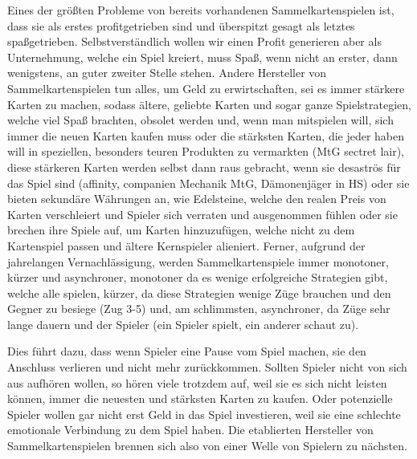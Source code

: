 \documentclass[fontsize=12]{scrartcl}
\begin{document}
	Eines der größten Probleme von bereits vorhandenen Sammelkartenspielen ist, dass sie als erstes profitgetrieben sind und überspitzt gesagt als letztes spaßgetrieben. Selbstverständlich wollen wir einen Profit generieren aber als Unternehmung, welche ein Spiel kreiert, muss Spaß, wenn nicht an erster, dann wenigstens, an guter zweiter Stelle stehen. Andere Hersteller von Sammelkartenspielen tun alles, um Geld zu erwirtschaften, sei es immer stärkere Karten zu machen, sodass ältere, geliebte Karten und sogar ganze Spielstrategien, welche viel Spaß brachten, obsolet werden und, wenn man mitspielen will, sich immer die neuen Karten kaufen muss oder die stärksten Karten, die jeder haben will in speziellen, besonders teuren Produkten zu vermarkten (MtG sectret lair), diese stärkeren Karten werden selbst dann raus gebracht, wenn sie desaströs für das Spiel sind (affinity, companien Mechanik MtG, Dämonenjäger in HS) oder sie bieten sekundäre Währungen an, wie Edelsteine, welche den realen Preis von Karten verschleiert und Spieler sich verraten und ausgenommen fühlen oder sie brechen ihre Spiele auf, um Karten hinzuzufügen, welche nicht zu dem Kartenspiel passen und ältere Kernspieler alieniert. Ferner, aufgrund der jahrelangen Vernachlässigung, werden Sammelkartenspiele immer monotoner, kürzer und asynchroner, monotoner da es wenige erfolgreiche Strategien gibt, welche alle spielen, kürzer, da diese Strategien wenige Züge brauchen und den Gegner zu besiege (Zug 3-5) und, am schlimmsten, asynchroner, da Züge sehr lange dauern und der Spieler (ein Spieler spielt, ein anderer schaut zu).\hfill\newline
	
	\noindent Dies führt dazu, dass wenn Spieler eine Pause vom Spiel machen, sie den Anschluss verlieren und nicht mehr zurückkommen. Sollten Spieler nicht von sich aus aufhören wollen, so hören viele trotzdem auf, weil sie es sich nicht leisten können, immer die neuesten und stärksten Karten zu kaufen. Oder potenzielle Spieler wollen gar nicht erst Geld in das Spiel investieren, weil sie eine schlechte emotionale Verbindung zu dem Spiel haben. Die etablierten Hersteller von Sammelkartenspielen brennen sich also von einer Welle von Spielern zu nächsten.\hfill\newline
	
\end{document}
